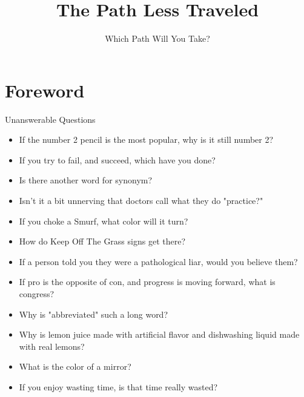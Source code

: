 \documentclass{42-en}
\begin{document}
    \title{The Path Less Traveled}
    \subtitle{Which Path Will You Take?}


\maketitle

\tableofcontents

\chapter{Foreword}

    Unanswerable Questions\\

    \begin{itemize}\itemsep1pt
        \item If the number 2 pencil is the most popular, why is it still number 2?
        \item If you try to fail, and succeed, which have you done?
        \item Is there another word for synonym?
        \item Isn't it a bit unnerving that doctors call what they do "practice?"
        \item If you choke a Smurf, what color will it turn?
        \item How do Keep Off The Grass signs get there?
        \item If a person told you they were a pathological liar, would you believe them?
        \item If pro is the opposite of con, and progress is moving forward, what is 
    congress?
        \item Why is "abbreviated" such a long word?
        \item Why is lemon juice made with artificial flavor and dishwashing liquid 
    made with real lemons?
        \item What is the color of a mirror?
        \item If you enjoy wasting time, is that time really wasted?
    \end{itemize}
   
\end{document}
